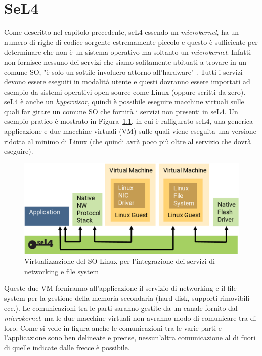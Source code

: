 \chapter{SeL4}
Come descritto nel capitolo precedente, seL4 essendo un \textit{microkernel}, ha un numero di righe di codice sorgente estremamente piccolo e questo è sufficiente per determinare che non è un sistema operativo ma soltanto un \textit{microkernel}. Infatti non fornisce nessuno dei servizi che siamo solitamente abituati a trovare in un comune SO, "è solo un sottile involucro attorno all'hardware" \cite{sel4-whitepaper}. Tutti i servizi devono essere eseguiti in modalità utente e questi dovranno essere importati ad esempio da sistemi operativi open-source come Linux (oppure scritti da zero). seL4 è anche un \textit{hypervisor}, quindi è possibile eseguire macchine virtuali sulle quali far girare un comune SO che fornirà i servizi non presenti in seL4.
Un esempio pratico è mostrato in Figura~\ref{fig:Virtualizzazione}, in cui è raffigurato seL4, una generica applicazione e due macchine virtuali (VM) sulle quali viene eseguita una versione ridotta al minimo di Linux (che quindi avrà poco più oltre al servizio che dovrà eseguire).
\begin{figure}[h]
  \includegraphics[width=\linewidth]{img/seL4Hypervisor.png}
  \caption{Virtualizzazione del SO Linux per l'integrazione dei servizi di networking e file system}
  \label{fig:Virtualizzazione}
\end{figure}
Queste due VM forniranno all'applicazione il servizio di networking e il file system per la gestione della memoria secondaria (hard disk, supporti rimovibili ecc.). Le comunicazioni tra le parti saranno gestite da un canale fornito dal \textit{microkernel}, ma le due macchine virtuali non avranno modo di comunicare tra di loro. Come si vede in figura anche le comunicazioni tra le varie parti e l'applicazione sono ben delineate e precise, nessun'altra comunicazione al di fuori di quelle indicate dalle frecce è possibile.

